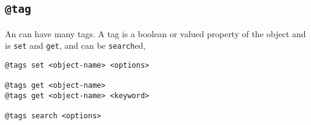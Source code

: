 \subsection{\texttt{@tag}}
\label{tag}

An  can have many tags. A tag is a boolean or valued property of the object and is \texttt{set} and \texttt{get}, and can be \texttt{search}ed,
%
\begin{verbatim}
@tags set <object-name> <options>

@tags get <object-name>
@tags get <object-name> <keyword>

@tags search <options>
\end{verbatim}